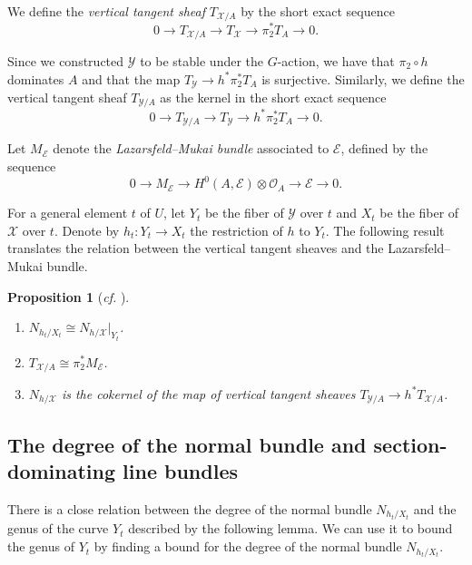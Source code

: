 \documentclass[10pt,a4paper]{article}
\numberwithin{equation}{section}
\newtheorem{proposition}[theorem]{Proposition}
\theoremstyle{definition}
\theoremstyle{remark}
\newcommand{\cO}{\mathcal{O}}
\begin{document}
We define the \textit{vertical tangent sheaf} $T_{\mathcal{X}/A}$ by the short exact sequence
\[ 0\longrightarrow T_{\mathcal{X}/A}\longrightarrow T_{\mathcal{X}} \longrightarrow \pi_2^*T_A \longrightarrow 0. \]

Since we constructed $\mathcal{Y}$ to be stable under the $G$-action, we have that $\pi_2\circ h$ dominates $A$ and that the map $T_{\mathcal{Y}}\to h^*\pi_2^*T_A$ is surjective. Similarly, we define the vertical tangent sheaf $T_{\mathcal{Y}/A}$ as the kernel in the short exact sequence
\[ 0\longrightarrow T_{\mathcal{Y}/A}\longrightarrow T_{\mathcal{Y}} \longrightarrow h^*\pi_2^*T_A \longrightarrow 0. \]

Let $M_{\mathcal{E}}$ denote the \textit{Lazarsfeld--Mukai bundle} associated to $\mathcal{E}$, defined by the sequence
\begin{equation*}
0\longrightarrow M_{\mathcal{E}} \longrightarrow H^0(A,\mathcal{E})\otimes \cO_A \longrightarrow \mathcal{E} \longrightarrow 0.
\end{equation*}

For a general element $t$ of $U$, let $Y_t$ be the fiber of $\mathcal{Y}$ over $t$ and $X_t$ be the fiber of $\mathcal{X}$ over $t$. Denote by $h_t\colon Y_t\to X_t$ the restriction of $h$ to $Y_t$. The following result translates the relation between the vertical tangent sheaves and the Lazarsfeld--Mukai bundle.

\begin{proposition}[\textit{cf.} {\cite[Proposition 2.1]{CR19}}]\label{CR19Prop2.1}\leavevmode
\begin{enumerate}
    \item $N_{h_t/X_t}\cong N_{h/\mathcal{X}}|_{Y_t}$.
    \item $T_{\mathcal{X}/A}\cong \pi_2^* M_{\mathcal{E}}$.
    \item $N_{h/\mathcal{X}}$ is the cokernel of the map of vertical tangent sheaves $T_{\mathcal{Y}/A}\to h^*T_{\mathcal{X}/A}$.
\end{enumerate}
\end{proposition}

\subsection{The degree of the normal bundle and section-dominating line bundles}

There is a close relation between the degree of the normal bundle $N_{h_t/X_t}$ and the genus of the curve $Y_t$ described by the following lemma. We can use it to bound the genus of $Y_t$ by finding a bound for the degree of the normal bundle $N_{h_t/X_t}$.
\end{document}
